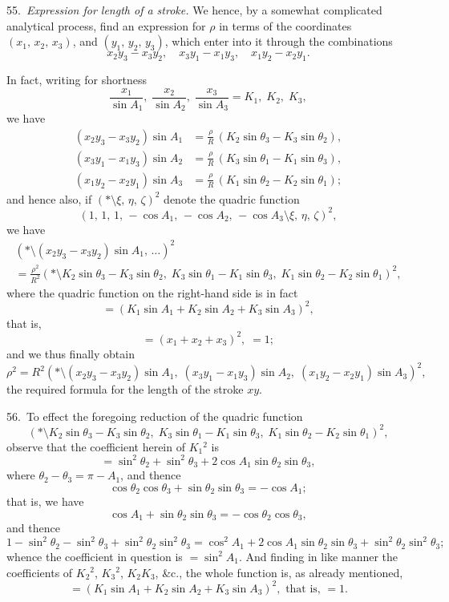 \documentclass[11pt,a4paper]{book}
\begin{document}
55.\ \textit{Expression for length of a stroke.} We hence, by a somewhat complicated
analytical process, find an expression for $\rho$ in terms of the coordinates
$(x_1,\, x_2,\, x_3)$, and $(y_1,\, y_2,\, y_3)$, which enter into it through the combinations
\[
x_2 y_3 - x_3 y_2, \quad x_3 y_1 - x_1 y_3, \quad x_1 y_2 - x_2 y_1.
\]

In fact, writing for shortness
\[
\frac{x_1}{\sin A_1},\; \frac{x_2}{\sin A_2},\; \frac{x_3}{\sin A_3} = K_1,\; K_2,\; K_3,
\]
we have
\begin{align*}
(x_2 y_3 - x_3 y_2) \sin A_1 &= \frac{\rho}{R}\, (K_2 \sin \theta_3 - K_3 \sin \theta_2),\\
(x_3 y_1 - x_1 y_3) \sin A_2 &= \frac{\rho}{R}\, (K_3 \sin \theta_1 - K_1 \sin \theta_3),\\
(x_1 y_2 - x_2 y_1) \sin A_3 &= \frac{\rho}{R}\, (K_1 \sin \theta_2 - K_2 \sin \theta_1);
\end{align*}
and hence also, if $(*\!\mathbin{\!\!\setminus\!\!}\xi,\, \eta,\, \zeta)^2$ denote the quadric function
\[
(1,\, 1,\, 1,\, -\cos A_1,\, -\cos A_2,\, -\cos A_3 \!\mathbin{\!\!\setminus\!\!}\xi,\, \eta,\, \zeta)^2,
\]
we have
\begin{multline*}
(*\!\mathbin{\!\!\setminus\!\!}(x_2 y_3 - x_3 y_2) \sin A_1,\, \ldots)^2\\
= \frac{\rho^2}{R^2}
(*\!\mathbin{\!\!\setminus\!\!}K_2 \sin \theta_3 - K_3 \sin \theta_2,\;
K_3 \sin \theta_1 - K_1 \sin \theta_3,\;
K_1 \sin \theta_2 - K_2 \sin \theta_1)^2,
\end{multline*}
where the quadric function on the right-hand side is in fact
\[
= (K_1 \sin A_1 + K_2 \sin A_2 + K_3 \sin A_3)^2,
\]
that is,
\[
= (x_1 + x_2 + x_3)^2,\; = 1;
\]
and we thus finally obtain
\[
\rho^2 = R^2
(*\!\mathbin{\!\!\setminus\!\!}(x_2 y_3 - x_3 y_2) \sin A_1,\;
(x_3 y_1 - x_1 y_3) \sin A_2,\;
(x_1 y_2 - x_2 y_1) \sin A_3)^2,
\]
the required formula for the length of the stroke $xy$.

56.\ To effect the foregoing reduction of the quadric function
\[
(*\!\mathbin{\!\!\setminus\!\!}K_2 \sin \theta_3 - K_3 \sin \theta_2,\;
K_3 \sin \theta_1 - K_1 \sin \theta_3,\;
K_1 \sin \theta_2 - K_2 \sin \theta_1)^2,
\]
observe that the coefficient herein of $K_1{}^2$ is
\[
= \sin^2 \theta_2 + \sin^2 \theta_3 + 2 \cos A_1 \sin \theta_2 \sin \theta_3,
\]
where $\theta_2 - \theta_3 = \pi - A_1$, and thence
\[
\cos \theta_2 \cos \theta_3 + \sin \theta_2 \sin \theta_3 = -\cos A_1;
\]
that is, we have
\[
\cos A_1 + \sin \theta_2 \sin \theta_3 = -\cos \theta_2 \cos \theta_3,
\]
and thence
\[
1 - \sin^2 \theta_2 - \sin^2 \theta_3 + \sin^2 \theta_2 \sin^2 \theta_3
= \cos^2 A_1 + 2 \cos A_1 \sin \theta_2 \sin \theta_3 + \sin^2 \theta_2 \sin^2 \theta_3;
\]
whence the coefficient in question is $= \sin^2 A_1$.
And finding in like manner the coefficients of $K_2{}^2$, $K_3{}^2$, $K_2 K_3$, \&c.,
the whole function is, as already mentioned,
\[
= (K_1 \sin A_1 + K_2 \sin A_2 + K_3 \sin A_3)^2, \text{ that is, } = 1.
\]
\end{document}
